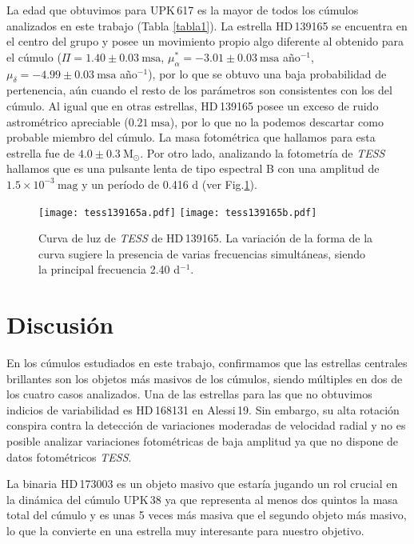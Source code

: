 \documentclass[baaa]{baaa}
\begin{document}
La edad que obtuvimos para UPK\,617 es la mayor de todos los cúmulos analizados en este trabajo (Tabla \ref{tabla1}). La estrella HD\,139165 se encuentra en el centro del grupo y posee un movimiento propio algo  diferente al obtenido para el cúmulo ($\varPi=1.40\pm0.03~\mathrm{msa}$, $\mu_\alpha^*=-3.01\pm0.03~\mathrm{msa}$ año$^{-1}$, $\mu_\delta=-4.99\pm0.03~\mathrm{msa}$ año$^{-1}$), por lo que se obtuvo una baja probabilidad de pertenencia, aún cuando el resto de los parámetros son consistentes con los del cúmulo. 
Al igual que en otras estrellas, HD\,139165 posee un exceso de ruido astrométrico apreciable ($0.21~\mathrm{msa}$), por lo que no la podemos descartar como probable miembro del cúmulo. La masa fotométrica que hallamos para esta estrella fue de $4.0\pm0.3~\mathrm{M_\odot}$. 
Por otro lado, analizando la fotometría de {\sl TESS} hallamos que es una pulsante lenta de tipo espectral B con una amplitud de $1.5\times10^{-3}~\mathrm{mag}$ y un período de 0.416 d (ver Fig.\ref{hd139165}).

\begin{figure}[!t]
\centering
\texttt{[image: tess139165a.pdf]}
\texttt{[image: tess139165b.pdf]}
\caption{Curva de luz de {\sl TESS} de HD\,139165. La variación de la forma de la curva sugiere la presencia de varias frecuencias simultáneas, siendo la principal frecuencia 2.40 d$^{-1}$.}
\label{hd139165}
\end{figure}

\section{Discusión}\label{sec:guia}
En los cúmulos estudiados en este trabajo, confirmamos que las estrellas centrales brillantes son los objetos más masivos de los cúmulos, siendo múltiples en dos de los cuatro casos analizados. 
Una de las estrellas para las que no obtuvimos indicios de variabilidad es HD\,168131 en Alessi\,19. Sin embargo, su alta rotación conspira contra la detección de variaciones moderadas de velocidad radial y no es posible analizar variaciones fotométricas de baja amplitud ya que no dispone de datos fotométricos {\sl TESS}. 

La binaria HD\,173003 es un objeto masivo que estaría jugando un rol crucial en la dinámica del cúmulo UPK\,38 ya que representa al menos dos quintos la masa total del cúmulo y es unas 5 veces más masiva que el segundo objeto más masivo, lo que la convierte en una estrella muy interesante para nuestro objetivo.
\end{document}
